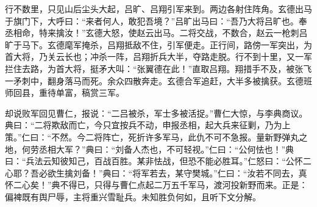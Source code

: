 行不数里，只见山后尘头大起，吕旷、吕翔引军来到。两边各射住阵角。玄德出马于旗门下，大呼曰：“来者何人，敢犯吾境？”吕旷出马曰：“吾乃大将吕旷也。奉丞相命，特来擒汝！”玄德大怒，使赵云出马。二将交战，不数合，赵云一枪刺吕旷于马下。玄德麾军掩杀，吕翔抵敌不住，引军便走。正行间，路傍一军突出，为首大将，乃关云长也；冲杀一阵，吕翔折兵大半，夺路走脱。行不到十里，又一军拦住去路，为首大将，挺矛大叫：“张翼德在此！”直取吕翔。翔措手不及，被张飞一矛刺中，翻身落马而死。余众四散奔走。玄德合军追赶，大半多被擒获。玄德班师回县，重待单富，稿赏三军。

却说败军回见曹仁，报说：“二吕被杀，军士多被活捉。”曹仁大惊，与李典商议。典曰：“二将欺敌而亡，今只宜按兵不动，申报丞相，起大兵来征剿，乃为上策。”仁曰：“不然。今二将阵亡，死折许多军马，此仇不可不急报。量新野弹丸之地，何劳丞相大军？”典曰：“刘备人杰也，不可轻视。”仁曰：“公何怯也！”典曰：“兵法云知彼知己，百战百胜。某非怯战，但恐不能必胜耳。”仁怒曰：“公怀二心耶？吾必欲生擒刘备！”典曰：“将军若去，某守樊城。”仁曰：“汝若不同去，真怀二心矣！”典不得已，只得与曹仁点起二万五千军马，渡河投新野而来。正是：偏裨既有舆尸辱，主将重兴雪耻兵。未知胜负何如，且听下文分解。